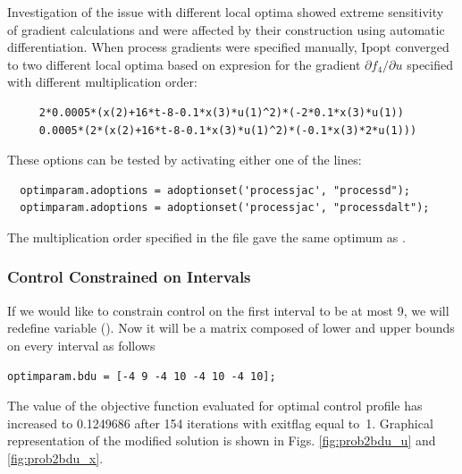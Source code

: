 Investigation of the issue with different local optima showed extreme
sensitivity of gradient calculations and were affected by their
construction using automatic differentiation. When process gradients
were specified manually, Ipopt converged to two different local optima
based on expresion for the gradient $\partial f_4/\partial u$
specified with different multiplication order:
\begin{verbatim}
     2*0.0005*(x(2)+16*t-8-0.1*x(3)*u(1)^2)*(-2*0.1*x(3)*u(1))
     0.0005*(2*(x(2)+16*t-8-0.1*x(3)*u(1)^2)*(-0.1*x(3)*2*u(1)))
\end{verbatim}
These options can be tested by activating either one of the lines:
\begin{verbatim}
  optimparam.adoptions = adoptionset('processjac', "processd");
  optimparam.adoptions = adoptionset('processjac', "processdalt");
\end{verbatim}
The multiplication order specified in the file  gave
the same optimum as .
\subsubsection{Control Constrained on Intervals}
If we would like to constrain control on the first interval to be at
most 9, we will redefine variable 
().  Now it will be a matrix composed
of lower and upper bounds on every interval as follows
\begin{verbatim}
optimparam.bdu = [-4 9 -4 10 -4 10 -4 10]; 
\end{verbatim}

The value of the objective function evaluated for optimal control
profile has increased to 0.1249686 after 154 iterations with exitflag
equal to~1. Graphical representation of the modified solution is shown
in Figs. \ref{fig:prob2bdu_u} and \ref{fig:prob2bdu_x}.

